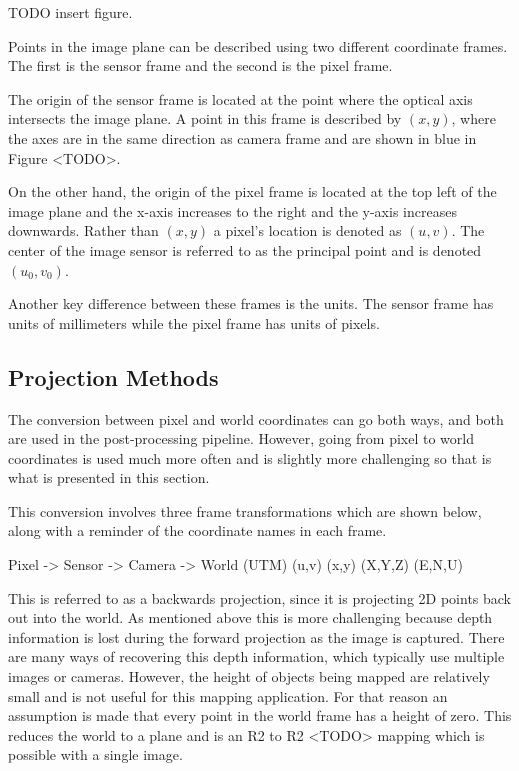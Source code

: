  TODO insert figure.  

 Points in the image plane can be described using two different coordinate frames.  The first is the sensor frame and the second is the pixel frame.  
 
 The origin of the sensor frame is located at the point where the optical axis intersects the image plane.  A point in this frame is described by $(x,y)$, where the axes are in the same direction as camera frame and are shown in blue in Figure <TODO>.  
 
 On the other hand, the origin of the pixel frame is located at the top left of the image plane and the x-axis increases to the right and the y-axis increases downwards.  Rather than $(x,y)$ a pixel's location is denoted as $(u,v)$.  The center of the image sensor is referred to as the principal point and is denoted $(u_0,v_0)$.
 
 Another key difference between these frames is the units.  The sensor frame has units of millimeters while the pixel frame has units of pixels.

 \subsection{Projection Methods}

 The conversion between pixel and world coordinates can go both ways, and both are used in the post-processing pipeline.  However, going from pixel to world coordinates is used much more often and is slightly more challenging so that is what is presented in this section.  
 
 This conversion involves three frame transformations which are shown below, along with a reminder of the coordinate names in each frame.     

 Pixel -> Sensor -> Camera -> World (UTM)
  (u,v)    (x,y)     (X,Y,Z)   (E,N,U)

 This is referred to as a backwards projection, since it is projecting 2D points back out into the world.  As mentioned above this is more challenging because depth information is lost during the forward projection as the image is captured.  There are many ways of recovering this depth information, which typically use multiple images or cameras.  However, the height of objects being mapped are relatively small and is not useful for this mapping application.  For that reason an assumption is made that every point in the world frame has a height of zero.  This reduces the world to a plane and is an R2 to R2 <TODO> mapping which is possible with a single image. 
 

